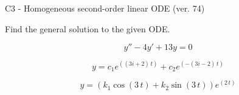 \begin{exercise}
  \begin{exerciseTitle}C3 - Homogeneous second-order linear ODE (ver. 74)\end{exerciseTitle}
  \begin{exerciseStatement}
    
Find the general solution to the given ODE.

    
\[y''-4y'+13y = 0\]

  \end{exerciseStatement}
  \begin{exerciseAnswer}
    
\[y= c_{1} e^{\left(\left(3 i + 2\right) \, t\right)} + c_{2} e^{\left(-\left(3 i - 2\right) \, t\right)}\]

    
\[y= {\left(k_{1} \cos\left(3 \, t\right) + k_{2} \sin\left(3 \, t\right)\right)} e^{\left(2 \, t\right)}\]

  \end{exerciseAnswer}
\end{exercise}